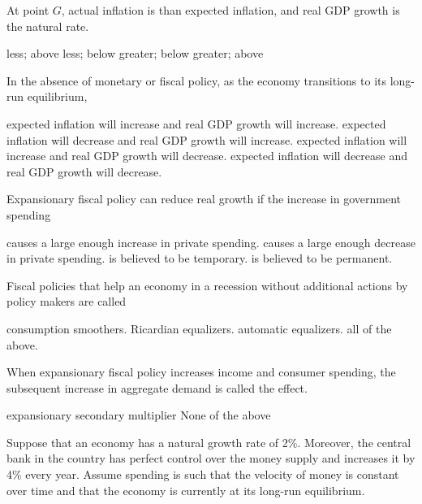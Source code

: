 \documentclass[addpoints,11pt]{exam}
\theoremstyle{definition}
\newcommand{\blank}[0]{\underline{\hspace{3cm}}}
\begin{document}
\begin{questions}
\question \label{q14} At point $G$, actual inflation is \blank than expected inflation, and real GDP growth is \blank the natural rate.

\begin{choices}
	\choice less; above 
	\choice less; below
	\choice greater; below
	\CorrectChoice greater; above
\end{choices}

\question \label{q15} In the absence of monetary or fiscal policy, as the economy transitions to its long-run equilibrium,

\begin{choices}
	\choice expected inflation will increase and real GDP growth will increase.
	\choice expected inflation will decrease and real GDP growth will increase.
	\CorrectChoice expected inflation will increase and real GDP growth will decrease.
	\choice expected inflation will decrease and real GDP growth will decrease.
\end{choices}


\question Expansionary fiscal policy can reduce real growth if the increase in government spending

\begin{choices}
	\choice causes a large enough increase in private spending.
	\CorrectChoice causes a large enough decrease in private spending.
	\choice is believed to be temporary.
	\choice is believed to be permanent.
\end{choices}

\question Fiscal policies that help an economy in a recession without additional actions by policy makers are called

\begin{choices}
	\choice consumption smoothers.
	\choice Ricardian equalizers.
	\CorrectChoice automatic equalizers.
	\choice all of the above.
\end{choices}

\question When expansionary fiscal policy increases income and consumer spending, the subsequent increase in aggregate demand is called the \blank effect.

\begin{choices}
	\choice expansionary
	\choice secondary
	\CorrectChoice multiplier
	\choice None of the above
\end{choices}


		\question Suppose that an economy has a natural growth rate of 2\%. Moreover, the central bank in the country has perfect control over the money supply and increases it by 4\% every year. Assume spending is such that the velocity of money is constant over time and that the economy is currently at its long-run equilibrium.
		

\end{questions}
\end{document}
